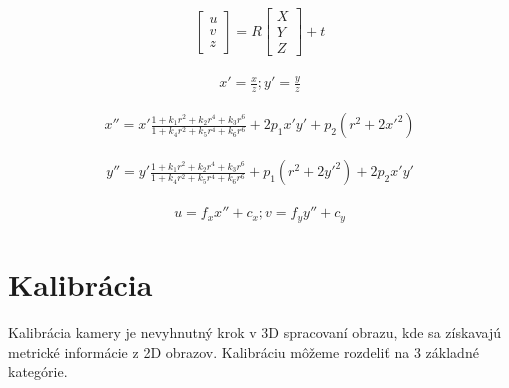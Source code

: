 \begin{equation}
\label{eq::real_camera::a}
\begin{aligned}
\begin{bmatrix}
u \\ v \\ z
\end{bmatrix} = R
\begin{bmatrix}
X \\ Y \\ Z
\end{bmatrix} + t 
\end{aligned}
\end{equation}

\begin{equation}
\label{eq::real_camera::b}
\begin{aligned}
x'= \frac{x}{z}; y'= \frac{y}{z}
\end{aligned}
\end{equation}

\begin{equation}
\label{eq::real_camera::d}
\begin{aligned}
x''= x' \frac{1 + k_{1}r^{2} + k_{2}r^{4} + k_{3}r^{6}}{1 + k_{4}r^{2} + k_{5}r^{4} + k_{6}r^{6}} + 2p_{1}x'y' + p_{2}\left(r^{2} + 2x'^{2}\right)
\end{aligned}
\end{equation}

\begin{equation}
\label{eq::real_camera::e}
\begin{aligned}
y''= y' \frac{1 + k_{1}r^{2} + k_{2}r^{4} + k_{3}r^{6}}{1 + k_{4}r^{2} + k_{5}r^{4} + k_{6}r^{6}} + p_{1}\left(r^{2} + 2y'^{2}\right) + 2p_{2}x'y'
\end{aligned}
\end{equation}


\begin{equation}
\label{eq::tangential_dist::f}
\begin{aligned}
u = f_{x} x'' + c_{x}; v = f_{y} y'' + c_{y}
\end{aligned}
\end{equation}


\section{Kalibrácia}

Kalibrácia kamery je nevyhnutný krok v 3D spracovaní obrazu, kde sa získavajú metrické informácie z 2D obrazov. Kalibráciu môžeme rozdeliť na 3 základné kategórie.

